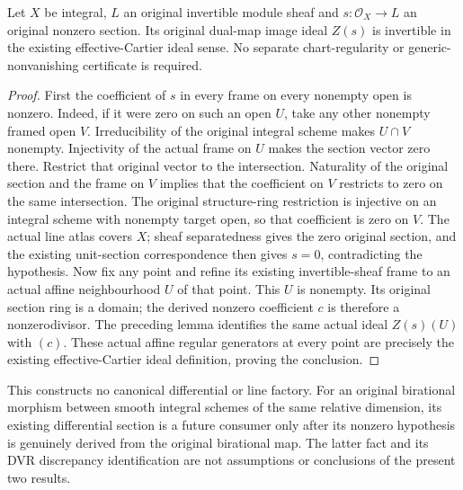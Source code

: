 \begin{theorem}
\label{thm:line-section-zero-ideal-cartier}
\leanok
{}
Let $X$ be integral, $L$ an original invertible module sheaf and
$s:\mathcal O_X\to L$ an original nonzero section. Its original dual-map
image ideal $Z(s)$ is invertible in the existing effective-Cartier ideal
sense. No separate chart-regularity or generic-nonvanishing certificate
is required.
\end{theorem}
\begin{proof}
First the coefficient of $s$ in every frame on every nonempty open is
nonzero. Indeed, if it were zero on such an open $U$, take any other
nonempty framed open $V$. Irreducibility of the original integral scheme
makes $U\cap V$ nonempty. Injectivity of the actual frame on $U$ makes the section vector
zero there. Restrict that original vector to the intersection. Naturality
of the original section and the frame on $V$ implies that the coefficient
on $V$ restricts to zero on the same intersection. The original structure-ring restriction is injective on an
integral scheme with nonempty target open, so that coefficient is zero
on $V$. The actual line atlas covers $X$; sheaf separatedness gives the
zero original section, and the existing unit-section correspondence then
gives $s=0$, contradicting the hypothesis.
Now fix any point and refine its existing invertible-sheaf frame to an
actual affine neighbourhood $U$ of that point. This $U$ is nonempty.
Its original section ring is a domain; the derived nonzero coefficient
$c$ is therefore a nonzerodivisor. The preceding lemma identifies the
same actual ideal $Z(s)(U)$ with $(c)$. These actual affine regular
generators at every point are precisely the existing effective-Cartier
ideal definition, proving the conclusion.
\end{proof}

This constructs no canonical differential or line factory. For an original
birational morphism between smooth integral schemes of the same relative
dimension, its existing differential section is a future consumer only
after its nonzero hypothesis is genuinely derived from the original
birational map. The latter fact and its DVR discrepancy identification
are not assumptions or conclusions of the present two results.
